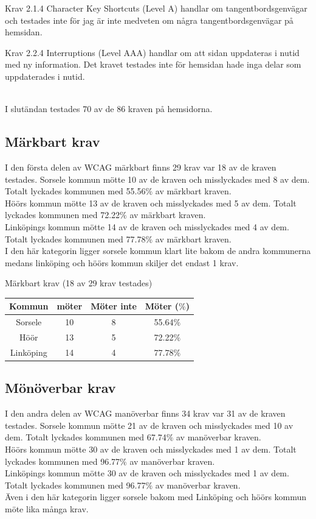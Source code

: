 \documentclass[11p]{article}
\begin{document}
    Krav 2.1.4 Character Key Shortcuts (Level A) handlar om tangentbordsgenvägar och testades inte för jag är inte medveten om några tangentbordsgenvägar på hemsidan.

    Krav 2.2.4 Interruptions (Level AAA) handlar om att sidan uppdateras i nutid med ny information.
    Det kravet testades inte för hemsidan hade inga delar som uppdaterades i nutid.

  \\  I slutändan testades 70 av de 86 kraven på hemsidorna.

    \subsection{Märkbart krav}
    I den första delen av WCAG märkbart finns 29 krav var 18 av de kraven testades.
    Sorsele kommun mötte 10 av de kraven och misslyckades med 8 av dem.
    Totalt lyckades kommunen med 55.56$\%$ av märkbart kraven.
    \\Höörs kommun mötte 13 av de kraven och misslyckades med 5 av dem.
    Totalt lyckades kommunen med 72.22$\%$ av märkbart kraven.
    \\Linköpings kommun mötte 14 av de kraven och misslyckades med 4 av dem.
    Totalt lyckades kommunen med 77.78$\%$ av märkbart kraven.
    \\I den här kategorin ligger sorsele kommun klart lite bakom de andra kommunerna medans linköping och höörs kommun skiljer det endast 1 krav.

    \begin{center}
    Märkbart krav (18 av 29 krav testades)

    \begin{tabular}{ |c|c|c|c|}
        \hline
        Kommun & möter & Möter inte & Möter ($\%$) \\  \hline
        Sorsele & 10 & 8 & 55.64$\%$ \\ \hline
        Höör & 13 & 5 & 72.22$\%$ \\ \hline
        Linköping & 14 & 4 & 77.78$\%$ \\ \hline
    \end{tabular}
    \end{center}

    \subsection{Mönöverbar krav}
    I den andra delen av WCAG manöverbar finns 34 krav var 31 av de kraven testades.
    Sorsele kommun mötte 21 av de kraven och misslyckades med 10 av dem.
    Totalt lyckades kommunen med 67.74$\%$ av manöverbar kraven.
    \\Höörs kommun mötte 30 av de kraven och misslyckades med 1 av dem.
    Totalt lyckades kommunen med 96.77$\%$ av manöverbar kraven.
    \\Linköpings kommun mötte 30 av de kraven och misslyckades med 1 av dem.
    Totalt lyckades kommunen med 96.77$\%$ av manöverbar kraven.
    \\Även i den här kategorin ligger sorsele bakom med Linköping och höörs kommun möte lika många krav.
\end{document}
